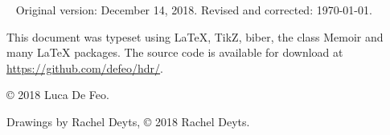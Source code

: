 \begin{titlingpage}
  \clearpage

  ~\vfill
  \footnotesize
  Original version: December 14, 2018. Revised and corrected: \today.
  
  \bigskip

  This document was typeset using \LaTeX{}, TikZ, biber, the class
  Memoir and many \LaTeX{} packages. The source code is available for
  download at \url{https://github.com/defeo/hdr/}.

  \bigskip

  \copyright{} 2018 Luca De Feo.
  
  \bigskip

  \ifartwork
  Drawings by Rachel Deyts, \copyright{} 2018 Rachel Deyts.
  \bigskip\fi

  \doclicenseThis
\end{titlingpage}

